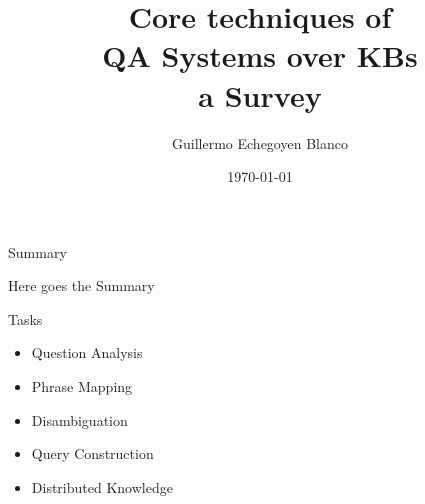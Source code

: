 \documentclass{beamer}
\date{\today}
\title{Core techniques of \\ \textbf{QA Systems over KBs \\ a Survey}}
\author{Guillermo Echegoyen Blanco}
\date{}
\begin{document}
\maketitle


\begin{frame}{Summary}
  \begin{card}
    Here goes the Summary
  \end{card}
\end{frame}


\begin{frame}{Tasks}
  \begin{card}
    \begin{itemize}
      \item Question Analysis
      \item Phrase Mapping
      \item Disambiguation
      \item Query Construction
      \item Distributed Knowledge
    \end{itemize}
  \end{card}
\end{frame}
\end{document}
